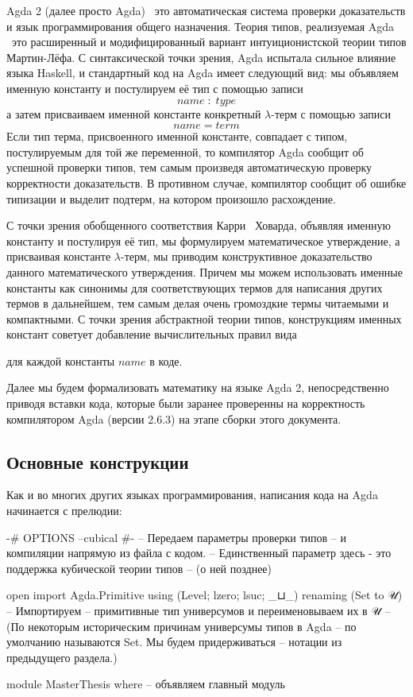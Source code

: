 \documentclass{article}[12pt]
\newcommand{\dash}{\textemdash\ }
\begin{document}
Agda 2 (далее просто Agda) \dash это автоматическая система проверки доказательств и язык программирования общего назначения.
Теория типов, реализуемая Agda \dash это расширенный и модифицированный вариант интуиционистской теории типов 
Мартин-Лёфа. С синтаксической точки зрения, Agda испытала сильное влияние языка Haskell, и стандартный
код на Agda имеет следующий вид: мы объявляем именную константу и постулируем её тип с помощью записи
$$ name \; : \; type$$
а затем присваиваем именной константе конкретный $\lambda$-терм с помощью записи
$$ name = term $$
Если тип терма, присвоенного именной константе, совпадает с типом, постулируемым для той же переменной,
то компилятор Agda сообщит об успешной проверки типов, тем самым произведя автоматическую проверку корректности
доказательств. В противном случае, компилятор сообщит об ошибке типизации и выделит подтерм, на котором произошло
расхождение.

С точки зрения обобщенного соответствия Карри \dash Ховарда, объявляя именную константу и постулируя
её тип, мы формулируем математическое утверждение, а присваивая константе $\lambda$-терм,
мы приводим конструктивное доказательство данного математического утверждения. Причем мы можем
использовать именные константы как синонимы для соответствующих термов для написания
других термов в дальнейшем, тем самым делая очень громоздкие термы читаемыми и компактными.
С точки зрения абстрактной теории типов, конструкциям именных констант советует добавление вычислительных 
правил вида
\begin{prooftree}
\end{prooftree}
для каждой константы $name$ в коде.

Далее мы будем формализовать математику на языке Agda 2, непосредственно приводя вставки кода, 
которые были заранее проверенны на корректность компилятором Agda (версии 2.6.3) на этапе сборки этого документа.

\subsection{Основные конструкции}

Как и во многих других языках программирования, написания кода на Agda начинается с прелюдии:
\begin{code}
{-# OPTIONS --cubical #-} -- Передаем параметры проверки типов 
-- и компиляции напрямую из файла с кодом.
-- Единственный параметр здесь - это поддержка кубической теории типов
-- (о ней позднее)

open import Agda.Primitive using (Level; lzero; lsuc; _⊔_)
                           renaming (Set to 𝒰) -- Импортируем
-- примитивные тип универсумов и переименовываем их в 𝒰
-- (По некоторым историческим причинам универсумы типов в Agda
-- по умолчанию называются Set. Мы будем придерживаться 
-- нотации из предыдущего раздела.)

module MasterThesis where -- объявляем главный модуль
\end{code}
\end{document}
